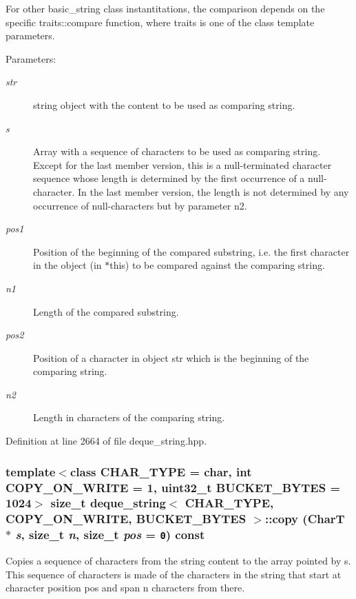 For other basic\_\-string class instantitations, the comparison depends on the specific traits::compare function, where traits is one of the class template parameters.

\begin{Desc}
\item[Parameters:]
\begin{description}
\item[{\em str}]string object with the content to be used as comparing string. \item[{\em s}]Array with a sequence of characters to be used as comparing string. Except for the last member version, this is a null-terminated character sequence whose length is determined by the first occurrence of a null-character. In the last member version, the length is not determined by any occurrence of null-characters but by parameter n2. \item[{\em pos1}]Position of the beginning of the compared substring, i.e. the first character in the object (in $\ast$this) to be compared against the comparing string. \item[{\em n1}]Length of the compared substring. \item[{\em pos2}]Position of a character in object str which is the beginning of the comparing string. \item[{\em n2}]Length in characters of the comparing string. \end{description}
\end{Desc}


Definition at line 2664 of file deque\_\-string.hpp.\hypertarget{classdeque__string_09f252cc4b51eeae6cb8f2f96795123e}{
\subsubsection[{copy}]{\setlength{\rightskip}{0pt plus 5cm}template$<$class CHAR\_\-TYPE  = char, int COPY\_\-ON\_\-WRITE = 1, uint32\_\-t BUCKET\_\-BYTES = 1024$>$ size\_\-t {\bf deque\_\-string}$<$ CHAR\_\-TYPE, COPY\_\-ON\_\-WRITE, BUCKET\_\-BYTES $>$::copy (CharT $\ast$ {\em s}, \/  size\_\-t {\em n}, \/  size\_\-t {\em pos} = {\tt 0}) const}}
\label{classdeque__string_09f252cc4b51eeae6cb8f2f96795123e}


Copies a sequence of characters from the string content to the array pointed by s. This sequence of characters is made of the characters in the string that start at character position pos and span n characters from there.

